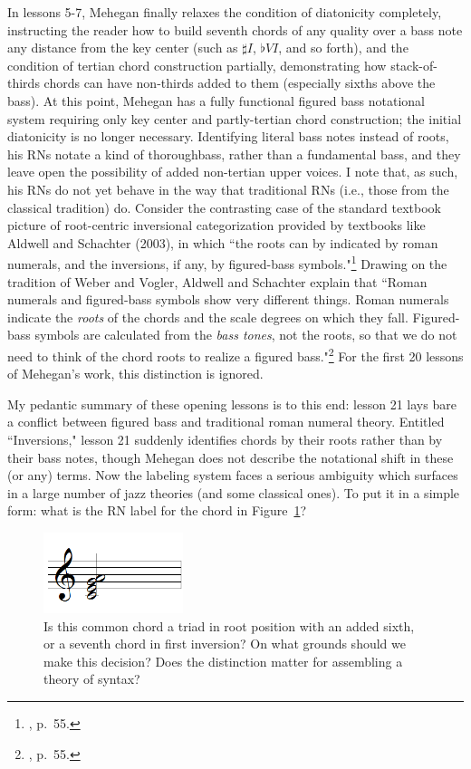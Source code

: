 In lessons 5-7, Mehegan finally relaxes the condition of diatonicity completely, instructing the reader how to build seventh chords of any quality over a bass note any distance from the key center (such as $\sharp I$, $\flat VI$, and so forth), and the condition of tertian chord construction partially, demonstrating how stack-of-thirds chords can have non-thirds added to them (especially sixths above the bass).  At this point, Mehegan has a fully functional figured bass notational system requiring only key center and partly-tertian chord construction; the initial diatonicity is no longer necessary.  Identifying literal bass notes instead of roots, his RNs notate a kind of thoroughbass, rather than a fundamental bass, and they leave open the possibility of added non-tertian upper voices.  I note that, as such, his RNs do not yet behave in the way that traditional RNs (i.e., those from the classical tradition) do.  Consider the contrasting case of the standard textbook picture of root-centric inversional categorization provided by textbooks like Aldwell and Schachter (2003), in which ``the roots can by indicated by roman numerals, and the inversions, if any, by figured-bass symbols."\footnote{\cite{aldwell2003}, p.\ 55.}  Drawing on the tradition of Weber and Vogler, Aldwell and Schachter explain that ``Roman numerals and figured-bass symbols show very different things.  Roman numerals indicate the \emph{roots} of the chords and the scale degrees on which they fall.  Figured-bass symbols are calculated from the \emph{bass tones}, not the roots, so that we do not need to think of the chord roots to realize a figured bass."\footnote{\cite{aldwell2003}, p.\ 55.}  For the first 20 lessons of Mehegan's work, this distinction is ignored.

My pedantic summary of these opening lessons is to this end: lesson 21 lays bare a conflict between figured bass and traditional roman numeral theory.  Entitled ``Inversions," lesson 21 suddenly identifies chords by their roots rather than by their bass notes, though Mehegan does not describe the notational shift in these (or any) terms.  Now the labeling system faces a serious ambiguity which surfaces in a large number of jazz theories (and some classical ones).  To put it in a simple form: what is the RN label for the chord in Figure~\ref{am_bigu}?
\begin{figure}
	\centering
	\caption{Is this common chord a triad in root position with an added sixth, or a seventh chord in first inversion?  On what grounds should we make this decision?  Does the distinction matter for assembling a theory of syntax?}
	\label{am_bigu}
	\includegraphics[width=1.6in]{diss_prospectus_cega.png}
\end{figure}

